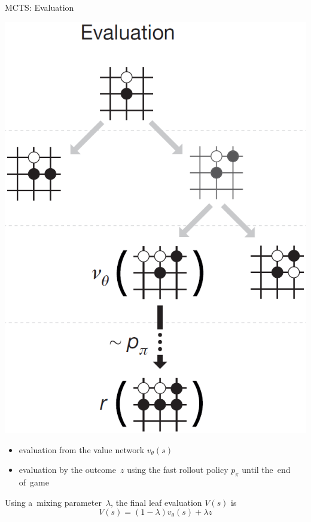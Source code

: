 \documentclass{beamer}
\begin{document}
{    \begin{frame}{MCTS: Evaluation}
      \begin{center}
        \includegraphics[height=.6\textheight]{../img/MCTS_evaluation.png}
      \end{center}
      \pause

      \tiny
      \begin{itemize}[<+- | alert@+>]
        \item evaluation from the value network $v_\theta (s)$
        \item evaluation by the outcome~$z$ using the fast rollout policy $p_\pi$ until the~end of~game
      \end{itemize}
      \pause
      Using a~mixing parameter~$\lambda$, the final leaf evaluation $V(s)$ is
      \[
        V(s) = (1 - \lambda) v_\theta(s) + \lambda z
      \]
    \end{frame}

}
\end{document}
